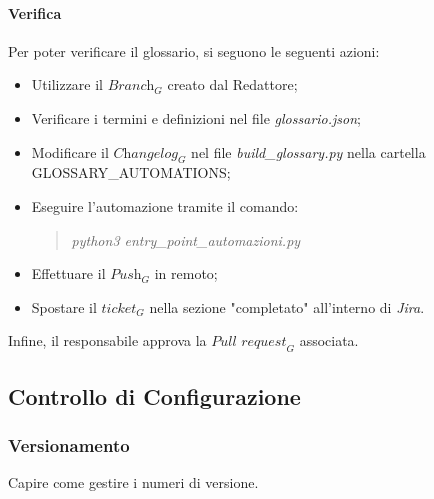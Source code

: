\paragraph{Verifica} Per poter verificare il glossario, si seguono le seguenti azioni:
\begin{itemize}
    \item Utilizzare il $\textit{Branch}_G$ creato dal Redattore;
    \item Verificare i termini e definizioni nel file \emph{glossario.json};
    \item Modificare il $\textit{Changelog}_G$ nel file \emph{build\_glossary.py} nella cartella GLOSSARY\_AUTOMATIONS;
    \item Eseguire l'automazione tramite il comando:
        \begin{quote}
            \emph{  python3 entry\_point\_automazioni.py} 
        \end{quote}
    \item Effettuare il $\textit{Push}_G$ in remoto;
    \item Spostare il $\textit{ticket}_G$ nella sezione "completato" all'interno di \emph{Jira}.
\end{itemize}
Infine, il responsabile approva la $\textit{Pull request}_G$ associata.

\subsection{Controllo di Configurazione}
\subsubsection{Versionamento}
Capire come gestire i numeri di versione.
